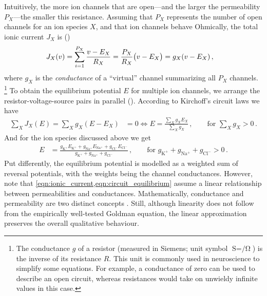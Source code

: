 Intuitively, the more ion channels that are open---and the larger the permeability $P_X$---the smaller this resistance.
Assuming that $P_X$ represents the number of open channels for an ion species $X$, and that ion channels behave Ohmically, the total ionic current $J_X$ is  ()
\begin{align}
	J_X(v) &= \sum_{i = 1}^{P_X} \frac{{v} - E_X}{R_X} = \frac{P_X}{R_X} \bigl( {v} - E_X \bigr) = g_X ({v} - E_X)\,,
	\label{eqn:ionic_current}
\end{align}
where $g_X$ is the \emph{conductance} of a \enquote{virtual} channel summarizing all $P_X$ channels.%
\footnote{The conductance $g$ of a resistor (measured in Siemens; unit symbol $\si{\siemens} = \si{\per\ohm}$) is the inverse of its resistance $R$.
This unit is commonly used in neuroscience to simplify some equations.
For example, a conductance of zero can be used to describe an open circuit, whereas resistances would take on unwieldy infinite values in this case.}
To obtain the equilibrium potential $E$ for multiple ion channels, we arrange the resistor-voltage-source pairs in parallel ().
According to Kirchoff's circuit laws we have
\begin{align}
	\sum_X J_X(E) = \sum_X g_X (E - E_X) &= 0 \Leftrightarrow E = \frac{\sum_X g_X E_X}{\sum_X g_X} \,, \quad \quad \text{for } \sum_X g_X > 0 \,.
	\label{eqn:circuit_equilibrium}
\end{align}
And for the ion species discussed above we get
\begin{align}
	E &= \frac{g_\mathrm{K^+} E_\mathrm{K^+} + g_\mathrm{Na^+} E_\mathrm{Na^+} + g_\mathrm{Cl^-} E_\mathrm{Cl^-}}{g_\mathrm{K^+} + g_\mathrm{Na^+} + g_\mathrm{Cl^-}} \,,  \quad \quad \text{for } g_\mathrm{K^+} + g_\mathrm{Na^+} + g_\mathrm{Cl^-} > 0 \,.
	\label{eqn:circuit_equilibrium_ions}
\end{align}
Put differently, the equilibrium potential is modelled as a weighted sum of reversal potentials, with the weights being the channel conductances.
However, note that \cref{eqn:ionic_current,eqn:circuit_equilibrium} assume a linear relationship between permeabilities and conductances.
Mathematically, conductance and permeability are two distinct concepts \citep{enderle2011bioelectric}.
Still, although linearity does not follow from the empirically well-tested Goldman equation, the linear approximation preserves the overall qualitative behaviour.%

